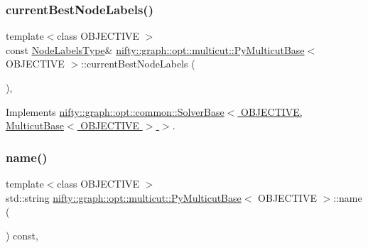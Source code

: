 \subsubsection{\texorpdfstring{current\+Best\+Node\+Labels()}{currentBestNodeLabels()}\hspace{0.1cm}{\footnotesize\ttfamily [2/2]}}
{\footnotesize\ttfamily template$<$class O\+B\+J\+E\+C\+T\+I\+VE $>$ \\
const \hyperlink{classnifty_1_1graph_1_1opt_1_1multicut_1_1PyMulticutBase_a34b9d7a58d056154c6b1abe7a83297c6}{Node\+Labels\+Type}\& \hyperlink{classnifty_1_1graph_1_1opt_1_1multicut_1_1PyMulticutBase}{nifty\+::graph\+::opt\+::multicut\+::\+Py\+Multicut\+Base}$<$ O\+B\+J\+E\+C\+T\+I\+VE $>$\+::current\+Best\+Node\+Labels (\begin{DoxyParamCaption}{ }\end{DoxyParamCaption})\hspace{0.3cm}{\ttfamily [inline]}, {\ttfamily [virtual]}}



Implements \hyperlink{classnifty_1_1graph_1_1opt_1_1common_1_1SolverBase_a7bbe01ee201cf3157b251e54c5ff0619}{nifty\+::graph\+::opt\+::common\+::\+Solver\+Base$<$ O\+B\+J\+E\+C\+T\+I\+V\+E, Multicut\+Base$<$ O\+B\+J\+E\+C\+T\+I\+V\+E $>$ $>$}.

\mbox{\label{classnifty_1_1graph_1_1opt_1_1multicut_1_1PyMulticutBase_a1542fd534762e4bc4c9415848e53e622}} 
\subsubsection{\texorpdfstring{name()}{name()}\hspace{0.1cm}{\footnotesize\ttfamily [1/2]}}
{\footnotesize\ttfamily template$<$class O\+B\+J\+E\+C\+T\+I\+VE $>$ \\
std\+::string \hyperlink{classnifty_1_1graph_1_1opt_1_1multicut_1_1PyMulticutBase}{nifty\+::graph\+::opt\+::multicut\+::\+Py\+Multicut\+Base}$<$ O\+B\+J\+E\+C\+T\+I\+VE $>$\+::name (\begin{DoxyParamCaption}{ }\end{DoxyParamCaption}) const\hspace{0.3cm}{\ttfamily [inline]}, {\ttfamily [virtual]}}



